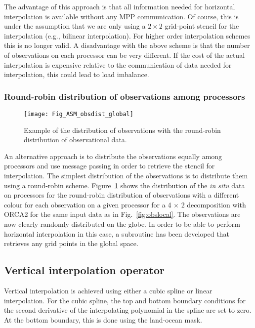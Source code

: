 \documentclass[NEMO_book]{subfiles}
\begin{document}
The advantage of this approach is that all
information needed for horizontal interpolation is available without
any MPP communication. Of course, this is under the assumption that 
we are only using a $2 \times 2$ grid-point stencil for the interpolation 
(e.g., bilinear interpolation). For higher order interpolation schemes this
is no longer valid. A disadvantage with the above scheme is that the number of
observations on each processor can be very different. If the cost of
the actual interpolation is expensive relative to the communication of
data needed for interpolation, this could lead to load imbalance.

\subsubsection{Round-robin distribution of observations among processors}

\begin{figure}     \begin{center}
\texttt{[image: Fig\_ASM\_obsdist\_global]}
\caption{      \label{fig:obsglobal}
Example of the distribution of observations with the round-robin distribution of observational data.}
\end{center}     \end{figure}

An alternative approach is to distribute the observations equally
among processors and use message passing in order to retrieve 
the stencil for interpolation. The simplest distribution of the observations 
is to distribute them using a round-robin scheme. Figure~\ref{fig:obsglobal}
shows the distribution of the {\em in situ} data on processors for the
round-robin distribution of observations with a different colour for
each observation on a given processor for a 4 $\times$ 2 decomposition 
with ORCA2 for the same input data as in Fig.~\ref{fig:obslocal}.
The observations are now clearly randomly distributed on the globe.
In order to be able to perform horizontal interpolation in this case, 
a subroutine has been developed that retrieves any grid points in the 
global space.

\subsection{Vertical interpolation operator}

Vertical interpolation is achieved using either a cubic spline or
linear interpolation. For the cubic spline, the top and
bottom boundary conditions for the second derivative of the 
interpolating polynomial in the spline are set to zero.
At the bottom boundary, this is done using the land-ocean mask.
\end{document}
